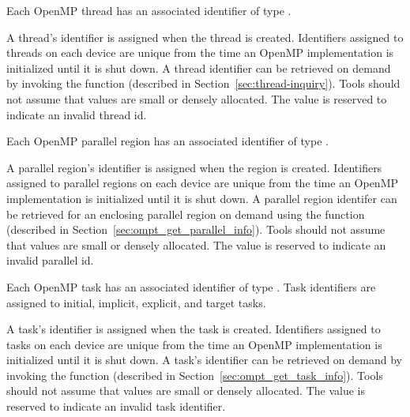 
Each OpenMP thread  has an associated identifier of type .
\begin{comment}
\begin{boxedcode}
typedef unsigned long long int ompt_thread_id_t;
\end{boxedcode}
\end{comment}
  A thread's identifier is assigned when the thread is created.
  Identifiers assigned to threads on each device are unique from the time an OpenMP implementation is initialized until it is shut down.
  A thread identifier can be retrieved
  on demand by invoking the  
  function (described in Section~\ref{sec:thread-inquiry}).
  Tools should not assume that  values are small or densely allocated.
  The value  is reserved to indicate an invalid thread id.

Each OpenMP parallel region has an associated identifier of type
.
\begin{comment}
\begin{boxedcode}
typedef unsigned long long int ompt_parallel_id_t;
\end{boxedcode}
\end{comment}
  A parallel region's identifier is assigned
  when the region is created.  Identifiers assigned to parallel regions on each device are unique from the time an
  OpenMP implementation is initialized until it is shut down.
  A parallel region identifer can be retrieved for an enclosing parallel region
  on demand using the function   (described in Section~\ref{sec:ompt_get_parallel_info}).
  Tools should not assume that  values are small or densely allocated.
  The value  is reserved to indicate an invalid parallel id.


Each OpenMP task has an associated identifier of type
. Task identifiers are assigned to
initial, implicit, explicit, and target tasks.
\begin{comment}
\begin{boxedcode}
typedef unsigned long long int ompt_task_id_t;
\end{boxedcode}
\end{comment}
  A task's identifier is assigned
  when the task is created.
  Identifiers assigned to tasks on each device are unique from the time an
  OpenMP implementation is initialized until it is shut down.
  A task's identifier can be retrieved
  on demand by invoking the   function (described in Section~\ref{sec:ompt_get_task_info}).
  Tools should not assume that  values are small or densely allocated.
  The value  is reserved to indicate an invalid task identifier.

